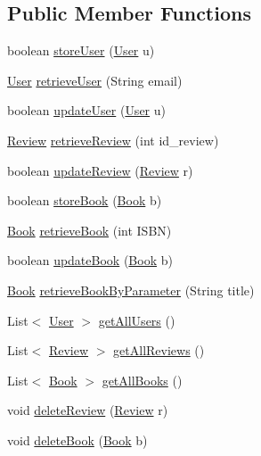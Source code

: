 \subsection*{Public Member Functions}
\begin{DoxyCompactItemize}
\item 
boolean \hyperlink{interfacedb_1_1_i_d_a_o_a5b1f408c9a25305e977e962faa38b026}{store\+User} (\hyperlink{classserver_1_1data_1_1_user}{User} u)
\item 
\hyperlink{classserver_1_1data_1_1_user}{User} \hyperlink{interfacedb_1_1_i_d_a_o_ad00bb5255d0badadbf5244799c3b708f}{retrieve\+User} (String email)
\item 
boolean \hyperlink{interfacedb_1_1_i_d_a_o_adbc5f00b7bcdffb6692367a3c9564193}{update\+User} (\hyperlink{classserver_1_1data_1_1_user}{User} u)
\item 
\hyperlink{classserver_1_1data_1_1_review}{Review} \hyperlink{interfacedb_1_1_i_d_a_o_a53fd20610d94f7c5f0f713dad7528c26}{retrieve\+Review} (int id\+\_\+review)
\item 
boolean \hyperlink{interfacedb_1_1_i_d_a_o_a7288e76ee3ce667c0d0d7ecaeef0d94e}{update\+Review} (\hyperlink{classserver_1_1data_1_1_review}{Review} r)
\item 
boolean \hyperlink{interfacedb_1_1_i_d_a_o_a39851dc1e1f05af40afeb76a5f8be99a}{store\+Book} (\hyperlink{classserver_1_1data_1_1_book}{Book} b)
\item 
\hyperlink{classserver_1_1data_1_1_book}{Book} \hyperlink{interfacedb_1_1_i_d_a_o_a1457ecf91799eaacd17cd3259826fc36}{retrieve\+Book} (int I\+S\+BN)
\item 
boolean \hyperlink{interfacedb_1_1_i_d_a_o_a202354d7a3e1231687d543e82c15a6f5}{update\+Book} (\hyperlink{classserver_1_1data_1_1_book}{Book} b)
\item 
\hyperlink{classserver_1_1data_1_1_book}{Book} \hyperlink{interfacedb_1_1_i_d_a_o_a4c5eda35bfbba1b0a994efe00f99a544}{retrieve\+Book\+By\+Parameter} (String title)
\item 
List$<$ \hyperlink{classserver_1_1data_1_1_user}{User} $>$ \hyperlink{interfacedb_1_1_i_d_a_o_a88b60729d9517ca9aa31b7db7ae07aee}{get\+All\+Users} ()
\item 
List$<$ \hyperlink{classserver_1_1data_1_1_review}{Review} $>$ \hyperlink{interfacedb_1_1_i_d_a_o_a3d9625d7e5426aad3c2e70fd0174e5f0}{get\+All\+Reviews} ()
\item 
List$<$ \hyperlink{classserver_1_1data_1_1_book}{Book} $>$ \hyperlink{interfacedb_1_1_i_d_a_o_a75a5ebcd7c3421ae7cccc8e2f3b2d9f9}{get\+All\+Books} ()
\item 
void \hyperlink{interfacedb_1_1_i_d_a_o_a78ca80bc2f2b660edeb9eddd8ca9a4b7}{delete\+Review} (\hyperlink{classserver_1_1data_1_1_review}{Review} r)
\item 
void \hyperlink{interfacedb_1_1_i_d_a_o_a1d6c98ea794177d7fd12c4a028ec29c1}{delete\+Book} (\hyperlink{classserver_1_1data_1_1_book}{Book} b)
\end{DoxyCompactItemize}


